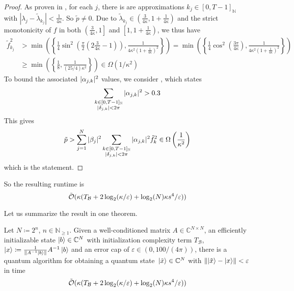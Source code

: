 \begin{proof}
    As proven in , for each \(j\), there is are approximations \(k_j \in [0, T-1]_{\mathbb{N}}\) with \(|\lambda_j - \tilde{\lambda}_{k_j}| < \frac{1}{4\kappa}\). So \(\tilde{p} \neq 0\). Due to \(\tilde{\lambda}_{k_j} \in \left(\frac{3}{4\kappa}, 1 + \frac{1}{4\kappa}\right)\) and the strict monotonicity of \(f\) in both \(\left(\frac{3}{4\kappa}, 1\right]\) and \(\left[1, 1+\frac{1}{4\kappa}\right)\), we thus have
    \begin{align}
        \tilde{f}_{k_j}^2 &> \min\left(\left\{\frac{1}{4}\sin^2\left(\frac{\pi}{2}\left(2\frac{3}{4\kappa}-1\right)\right), \frac{1}{4\kappa^2\left(1+\frac{1}{4\kappa}\right)^2}\right\}\right) = \min\left(\left\{\frac{1}{4}\cos^2\left(\frac{3\pi}{4\kappa}\right), \frac{1}{4\kappa^2\left(1+\frac{1}{4\kappa}\right)^2}\right\}\right)\\
        &\geq \min\left(\left\{\frac{1}{8}, \frac{1}{(25/4)\kappa^2}\right\}\right) \in \Omega(1/\kappa^2)
    \end{align}
    To bound the associated \(|\alpha_{j, k}|^2\) values, we consider , which states
    \begin{align}
        \sum_{\substack{k \in [0, T-1]_{\mathbb{N}}\\|\delta_{j, k}| < 2\pi}} |\alpha_{j, k}|^2 > 0.3
    \end{align}
    This gives
    \begin{align}
        \tilde{p} > \sum_{j=1}^N |\beta_j|^2 \sum_{\substack{k \in [0, T-1]_{\mathbb{N}}\\|\delta_{j, k}| < 2\pi}} |\alpha_{j, k}|^2 \tilde{f}_k^2 \in \Omega\left(\frac{1}{\kappa^2}\right)
    \end{align}
    which is the statement.
\end{proof}

So the resulting runtime is
\begin{align}
    \tilde{\operatorname{\mathcal{O}}}(\kappa (T_{\mathcal{B}}+2\log_2(\kappa/\varepsilon)+\log_2(N)\kappa s^4/\varepsilon))
\end{align}

Let us summarize the result in one theorem.

\begin{theorem}
    Let \(N \coloneqq 2^n\), \(n \in \mathbb{N}_{\geq 1}\). Given a well-conditioned matrix \(A \in \mathbb{C}^{N \times N}\), an efficiently initializable state \(\ket{b} \in \mathbb{C}^N\) with initialization complexity term \(T_{\mathcal{B}}\), \(\ket{x} \coloneqq \frac{1}{\norm{A^{-1}\ket{b}}} A^{-1}\ket{b}\) and an error cap of \(\varepsilon \in (0, 100/(4\pi))\), there is a quantum algorithm for obtaining a quantum state \(\ket*{\tilde{x}} \in \mathbb{C}^N\) with \(\norm{\ket{\tilde{x}}-\ket{x}} < \varepsilon\) in time
    \begin{align}
        \tilde{\operatorname{\mathcal{O}}}(\kappa(T_{\mathcal{B}}+2\log_2(\kappa/\varepsilon)+\log_2(N)\kappa s^4 / \varepsilon))
    \end{align}
\end{theorem}

